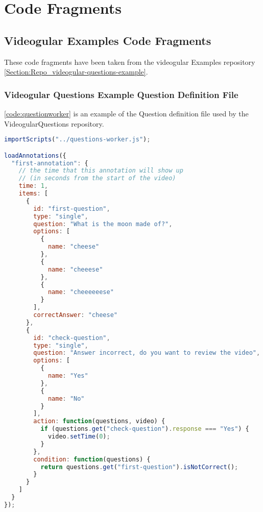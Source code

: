 \chapter{Code Fragments} \label{Chapter:Code Fragments}


\section{Videogular Examples Code Fragments}

These code fragments have been taken from the videogular Examples repository \autoref{Section:Repo_videogular-questions-example}.

\subsection{Videogular Questions Example Question Definition File}

\autoref{code:questionworker} is an example of the Question definition file used by the VideogularQuestions repository.

\begin{lstlisting}[language=javascript,caption={Code for loading an annotation},label={code:questionworker} ]
importScripts("../questions-worker.js");

loadAnnotations({
  "first-annotation": {
    // the time that this annotation will show up
    // (in seconds from the start of the video)
    time: 1,
    items: [
      {
        id: "first-question",
        type: "single",
        question: "What is the moon made of?",
        options: [
          {
            name: "cheese"
          },
          {
            name: "cheeese"
          },
          {
            name: "cheeeeeese"
          }
        ],
        correctAnswer: "cheese"
      },
      {
        id: "check-question",
        type: "single",
        question: "Answer incorrect, do you want to review the video",
        options: [
          {
            name: "Yes"
          },
          {
            name: "No"
          }
        ],
        action: function(questions, video) {
          if (questions.get("check-question").response === "Yes") {
            video.setTime(0);
          }
        },
        condition: function(questions) {
          return questions.get("first-question").isNotCorrect();
        }
      }
    ]
  }
});
\end{lstlisting}
